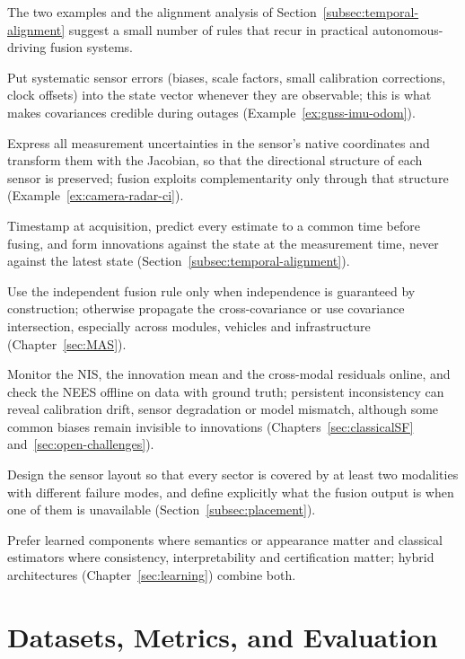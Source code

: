 The two examples and the alignment analysis of Section~\ref{subsec:temporal-alignment} suggest a small number of rules that recur in practical autonomous-driving fusion systems.
\begin{list4a}
\item Put systematic sensor errors (biases, scale factors, small calibration corrections, clock offsets) into the state vector whenever they are observable; this is what makes covariances credible during outages (Example~\ref{ex:gnss-imu-odom}).
\item Express all measurement uncertainties in the sensor's native coordinates and transform them with the Jacobian, so that the directional structure of each sensor is preserved; fusion exploits complementarity only through that structure (Example~\ref{ex:camera-radar-ci}).
\item Timestamp at acquisition, predict every estimate to a common time before fusing, and form innovations against the state at the measurement time, never against the latest state (Section~\ref{subsec:temporal-alignment}).
\item Use the independent fusion rule only when independence is guaranteed by construction; otherwise propagate the cross-covariance or use covariance intersection, especially across modules, vehicles and infrastructure (Chapter~\ref{sec:MAS}).
\item Monitor the NIS, the innovation mean and the cross-modal residuals online, and check the NEES offline on data with ground truth; persistent inconsistency can reveal calibration drift, sensor degradation or model mismatch, although some common biases remain invisible to innovations (Chapters~\ref{sec:classicalSF} and~\ref{sec:open-challenges}).
\item Design the sensor layout so that every sector is covered by at least two modalities with different failure modes, and define explicitly what the fusion output is when one of them is unavailable (Section~\ref{subsec:placement}).
\item Prefer learned components where semantics or appearance matter and classical estimators where consistency, interpretability and certification matter; hybrid architectures (Chapter~\ref{sec:learning}) combine both.
\end{list4a}

\section{Datasets, Metrics, and Evaluation}

